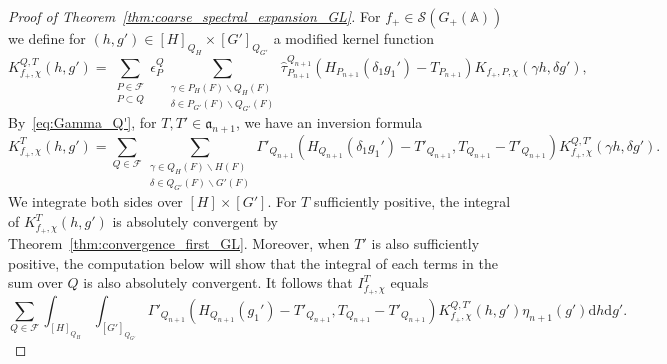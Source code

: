 \documentclass[letterpaper,11pt]{amsart}
\newcommand{\fa}{\mathfrak{a}}
\newcommand{\bA}{\mathbb{A}}
\newcommand{\cF}{\mathcal{F}}
\newcommand{\cS}{\mathcal{S}}
\newcommand{\rd}{\mathrm{d}}
\newcommand{\<}{\negthickspace}
\theoremstyle{definition}
\theoremstyle{plain}
\theoremstyle{remark}
\numberwithin{equation}{section}
\begin{document}
\begin{proof}[Proof of Theorem~\ref{thm:coarse_spectral_expansion_GL}]
For $f_+ \in \cS(G_+(\bA))$ we define for $(h, g') \in [H]_{Q_H} \times
[G']_{Q_{G'}}$ a modified kernel function
    \[
    K_{f_+,\chi}^{Q,T}(h,g') =
    \sum_{\substack{P \in \cF \\ P \subset Q}}
    \epsilon_P^Q \sum_{ \substack{\gamma \in P_H(F) \backslash Q_H(F)
    \\ \delta \in P_{G'}(F) \backslash Q_{G'}(F)}}
    \widehat{\tau}_{P_{n+1}}^{Q_{n+1}}
    (H_{P_{n+1}}(\delta_1 g_1')-T_{P_{n+1}})
    K_{f_+, P, \chi}(\gamma h,\delta g'),
    \]
By~\eqref{eq:Gamma_Q'}, for $T, T' \in \fa_{n+1}$, we have an inversion
formula
    \[
    K_{f_+,\chi}^T(h,g') =
    \sum_{Q \in \cF}
    \sum_{ \substack{\gamma \in Q_H(F) \backslash H(F)
    \\ \delta \in Q_{G'}(F) \backslash G'(F)}}
    \Gamma'_{Q_{n+1}}(H_{Q_{n+1}}(\delta_1 g_1')-T'_{Q_{n+1}},
    T_{Q_{n+1}}-T'_{Q_{n+1}})
    K_{f_+,\chi}^{Q,T'}(\gamma h,\delta g').
    \]
We integrate both sides over $[H] \times [G']$. For $T$ sufficiently
positive, the integral of $K_{f_+,\chi}^T(h,g')$ is absolutely convergent by
Theorem~\ref{thm:convergence_first_GL}. Moreover, when $T'$ is also sufficiently
positive, the computation below will show that the integral of each terms in
the sum over $Q$ is also absolutely convergent. It follows that $I_{f_+,
\chi}^T$ equals
    \begin{equation}    \label{eq:I_chi_inversion}
    \sum_{Q \in \cF} \int_{[H]_{Q_H}} \int_{[G']_{Q_{G'}}}
    \Gamma'_{Q_{n+1}}(H_{Q_{n+1}}(g_1')-T'_{Q_{n+1}},T_{Q_{n+1}}-T'_{Q_{n+1}})
    K_{f_+,\chi}^{Q,T'}(h,g') \eta_{n+1}(g') \rd h \rd g'.
    \end{equation}


\end{proof}
\end{document}
